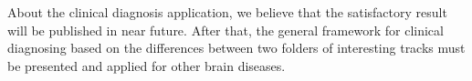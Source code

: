 About the clinical diagnosis application, we believe that the satisfactory result will be published in near future. After that, the general framework for clinical diagnosing based on the differences between two folders of interesting tracks must be presented and applied for other brain diseases.


